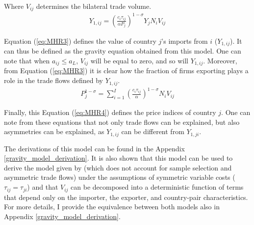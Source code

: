 Where $V_{ij}$ determines the bilateral trade volume.
\begin{align}
    Y_{1,i j}=\left(\frac{c_{i} \tau_{i j}}{\alpha P_{j}}\right)^{1-\sigma} Y_{j} N_{i} V_{i j}
    \label{eq:MHR3}
\end{align}

Equation (\ref{eq:MHR3}) defines the value of country $j$'s imports from $i$ ($Y_{1,ij}$). It can thus be defined as the gravity equation obtained from this model. One can note that when $a_{ij} \leq a_L$, $V_{ij}$ will be equal to zero, and so will $Y_{1,ij}$. Moreover, from Equation (\ref{eq:MHR3}) it is clear how the fraction of firms exporting plays a role in the trade flows defined by $Y_{1,ij}$. 
\begin{align} \label{eq:MHR4}
    P_{j}^{1-\sigma}=\sum_{i=1}^{I}\left(\frac{c_{i} \tau_{i j}}{\alpha}\right)^{1-\sigma} N_{i} V_{i j}
\end{align}

Finally, this Equation (\ref{eq:MHR4}) defines the price indices of country $j$. One can note from these equations that not only trade flows can be explained, but also asymmetries can be explained, as $Y_{1,ij}$ can be different from $Y_{1,ji}$.

The derivations of this model can be found in the Appendix \ref{gravity_model_derivation}. It is also shown that this model can be used to derive the model given by \cite{anderson2003gravity} (which does not account for sample selection and asymmetric trade flows) under the assumptions of symmetric variable costs ($\tau_{ij} = \tau_{ji}$) and that $V_{ij}$ can be decomposed into a deterministic function of terms that depend only on the importer, the exporter, and country-pair characteristics. For more details, I provide the equivalence between both models also in Appendix \ref{gravity_model_derivation}.



